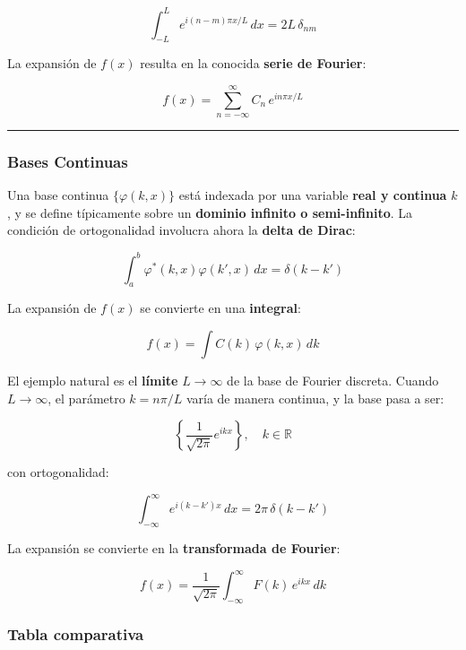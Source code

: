 \documentclass[a4paper]{article}
\begin{document}
$$\int_{-L}^{L} e^{i(n-m)\pi x/L}\, dx = 2L\,\delta_{nm}$$

La expansión de $f(x)$ resulta en la conocida \textbf{serie de Fourier}:

$$f(x) = \sum_{n=-\infty}^{\infty} C_n\, e^{in\pi x/L}$$

\vspace{1em}
\hrule
\vspace{1em}

\subsubsection{Bases Continuas}

Una base continua $\{\varphi(k, x)\}$ está indexada por una variable \textbf{real y continua} $k$, y se define típicamente sobre un \textbf{dominio infinito o semi-infinito}. La condición de ortogonalidad involucra ahora la \textbf{delta de Dirac}:

$$\int_a^b \varphi^*(k, x)\varphi(k', x)\, dx = \delta(k - k')$$

La expansión de $f(x)$ se convierte en una \textbf{integral}:

$$f(x) = \int C(k)\,\varphi(k, x)\, dk$$

El ejemplo natural es el \textbf{límite} $L \to \infty$ de la base de Fourier discreta. Cuando $L \to \infty$, el parámetro $k = n\pi/L$ varía de manera continua, y la base pasa a ser:

$$\left\{\frac{1}{\sqrt{2\pi}}e^{ikx}\right\}, \quad k \in \mathbb{R}$$

con ortogonalidad:

$$\int_{-\infty}^{\infty} e^{i(k-k')x}\, dx = 2\pi\,\delta(k - k')$$

La expansión se convierte en la \textbf{transformada de Fourier}:

$$f(x) = \frac{1}{\sqrt{2\pi}}\int_{-\infty}^{\infty} F(k)\, e^{ikx}\, dk$$

\subsubsection{Tabla comparativa}
\end{document}
